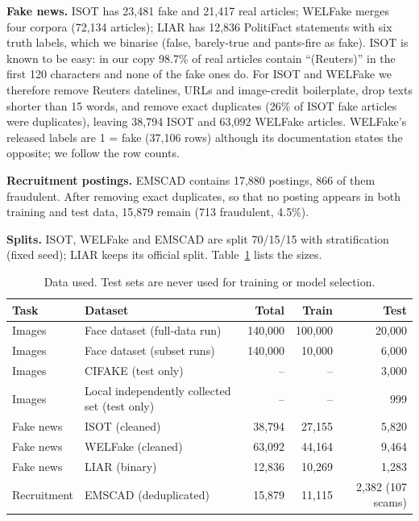 \documentclass[11pt,a4paper]{article}
\begin{document}
\textbf{Fake news.} ISOT \cite{ahmed2017isot} has 23{,}481 fake and 21{,}417 real articles; WELFake \cite{verma2021welfake} merges four corpora (72{,}134 articles); LIAR \cite{wang2017liar} has 12{,}836 PolitiFact statements with six truth labels, which we binarise (false, barely-true and pants-fire as fake). ISOT is known to be easy: in our copy 98.7\% of real articles contain ``(Reuters)'' in the first 120 characters and none of the fake ones do. For ISOT and WELFake we therefore remove Reuters datelines, URLs and image-credit boilerplate, drop texts shorter than 15 words, and remove exact duplicates (26\% of ISOT fake articles were duplicates), leaving 38{,}794 ISOT and 63{,}092 WELFake articles. WELFake's released labels are 1 = fake (37{,}106 rows) although its documentation states the opposite; we follow the row counts.

\textbf{Recruitment postings.} EMSCAD \cite{vidros2017emscad} contains 17{,}880 postings, 866 of them fraudulent. After removing exact duplicates, so that no posting appears in both training and test data, 15{,}879 remain (713 fraudulent, 4.5\%).

\textbf{Splits.} ISOT, WELFake and EMSCAD are split 70/15/15 with stratification (fixed seed); LIAR keeps its official split. Table~\ref{tab:data} lists the sizes.

\begin{table}[h]
\centering
\caption{Data used. Test sets are never used for training or model selection.}\label{tab:data}
\begin{tabular}{llrrr}
\toprule
Task & Dataset & Total & Train & Test \\
\midrule
Images & Face dataset (full-data run) & 140{,}000 & 100{,}000 & 20{,}000 \\
Images & Face dataset (subset runs) & 140{,}000 & 10{,}000 & 6{,}000 \\
Images & CIFAKE (test only) & -- & -- & 3{,}000 \\
Images & Local independently collected set (test only) & -- & -- & 999 \\
Fake news & ISOT (cleaned) & 38{,}794 & 27{,}155 & 5{,}820 \\
Fake news & WELFake (cleaned) & 63{,}092 & 44{,}164 & 9{,}464 \\
Fake news & LIAR (binary) & 12{,}836 & 10{,}269 & 1{,}283 \\
Recruitment & EMSCAD (deduplicated) & 15{,}879 & 11{,}115 & 2{,}382 (107 scams) \\
\bottomrule
\end{tabular}
\end{table}
\end{document}
